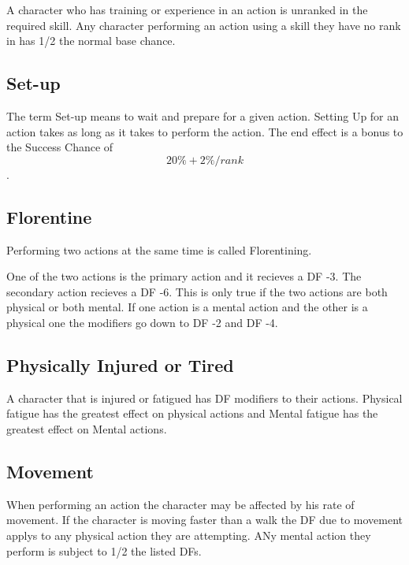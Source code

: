 A character who has training or experience in an action is
unranked in the required skill. Any character performing an action using 
a skill they have no rank in has 1/2 the normal base chance. 

\subsection{Set-up}

The term Set-up means to wait and prepare for a given action. Setting Up for
an action takes as long as it takes to perform the action. The end effect is a
bonus to the Success Chance of \[ 20\% + 2\%/rank\]. 

\subsection{Florentine}

Performing two actions at the same time is called Florentining.

One of the two actions is the primary action and it recieves a 
DF -3. The secondary action recieves a DF -6. This is only true 
if the two actions are both physical or both mental. If one 
action is a mental action and the other is a physical one the modifiers
go down to DF -2 and DF -4.



\subsection{Physically Injured or Tired}

A character that is injured or fatigued has DF modifiers to 
their actions. Physical fatigue has the greatest effect on physical actions 
and Mental fatigue has the greatest effect on Mental actions.




\subsection{Movement} 

When performing an action the character may be affected by 
his rate of movement. If the character is moving faster than a 
walk the DF due to movement applys to any physical action they are 
attempting. ANy mental action they perform is subject to 1/2 
the listed DFs.

